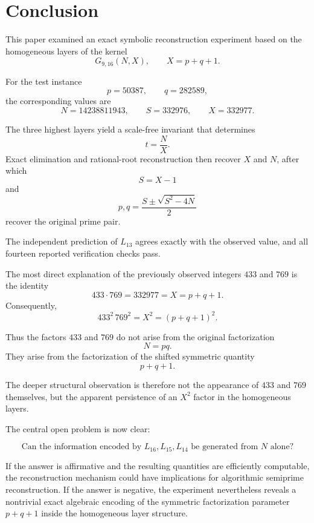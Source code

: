 \documentclass[11pt,a4paper]{article}
\theoremstyle{definition}
\theoremstyle{remark}
\begin{document}
\section{Conclusion}

This paper examined an exact symbolic reconstruction experiment based on
the homogeneous layers of the kernel
\[
G_{9,16}(N,X),
\qquad
X=p+q+1.
\]

For the test instance
\[
p=50387,\qquad q=282589,
\]
the corresponding values are
\[
N=14238811943,
\qquad
S=332976,
\qquad
X=332977.
\]

The three highest layers yield a scale-free invariant that determines
\[
t=\frac{N}{X}.
\]
Exact elimination and rational-root reconstruction then recover $X$ and
$N$, after which
\[
S=X-1
\]
and
\[
p,q=\frac{S\pm\sqrt{S^2-4N}}{2}
\]
recover the original prime pair.

The independent prediction of $L_{13}$ agrees exactly with the observed
value, and all fourteen reported verification checks pass.

The most direct explanation of the previously observed integers $433$ and
$769$ is the identity
\[
433\cdot769=332977=X=p+q+1.
\]
Consequently,
\[
\boxed{
433^2\,769^2
=
X^2
=
(p+q+1)^2.
}
\]

Thus the factors $433$ and $769$ do not arise from the original
factorization
\[
N=pq.
\]
They arise from the factorization of the shifted symmetric quantity
\[
p+q+1.
\]

The deeper structural observation is therefore not the appearance of
$433$ and $769$ themselves, but the apparent persistence of an $X^2$
factor in the homogeneous layers.

The central open problem is now clear:

\begin{equation}
\boxed{
\text{Can the information encoded by }
L_{16},L_{15},L_{14}
\text{ be generated from }N\text{ alone?}
}
\end{equation}

If the answer is affirmative and the resulting quantities are efficiently
computable, the reconstruction mechanism could have implications for
algorithmic semiprime reconstruction.  If the answer is negative, the
experiment nevertheless reveals a nontrivial exact algebraic encoding of
the symmetric factorization parameter $p+q+1$ inside the homogeneous layer
structure.

\appendix
\end{document}
